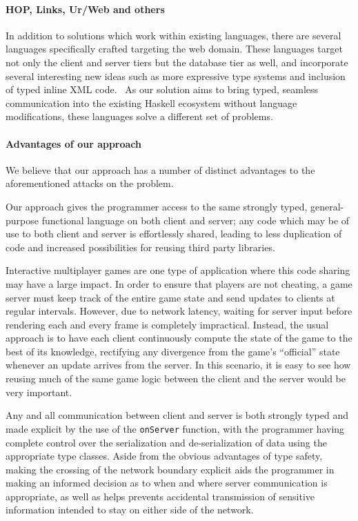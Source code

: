 \documentclass[preprint]{sigplanconf}
\begin{document}
\paragraph{HOP, Links, Ur/Web and others} In addition to solutions which work
within existing languages, there are several languages specifically crafted
targeting the web domain. These languages target not only the client and server
tiers but the database tier as well, and incorporate several interesting new
ideas such as more expressive type systems and inclusion of typed inline XML
code.\ \cite{hop}\cite{links}\cite{urweb} As our solution aims to bring typed,
seamless communication into the existing Haskell ecosystem without language
modifications, these languages solve a different set of problems.

\paragraph{Advantages of our approach} We believe that our approach has a
number of distinct advantages to the aforementioned attacks on the problem.

Our approach gives the programmer access to the same strongly typed,
general-purpose functional language on both client and server; any code which
may be of use to both client and server is effortlessly shared, leading to less
duplication of code and increased possibilities for reusing third party
libraries.

Interactive multiplayer games are one type of application where this code
sharing may have a large impact. In order to ensure that players are not
cheating, a game server must keep track of the entire game state and send
updates to clients at regular intervals. However, due to network latency,
waiting for server input before rendering each and every frame is completely
impractical. Instead, the usual approach is to have each client continuously
compute the state of the game to the best of its knowledge, rectifying any
divergence from the game's ``official'' state whenever an update arrives from
the server. In this scenario, it is easy to see how reusing much of the same
game logic between the client and the server would be very important.

Any and all communication between client and server is both strongly typed
and made explicit by the use of the \lstinline!onServer! function, with the
programmer having complete control over the serialization and de-serialization
of data using the appropriate type classes. Aside from the obvious advantages
of type safety, making the crossing of the network boundary explicit aids the
programmer in making an informed decision as to when and where server
communication is appropriate, as well as helps prevents accidental transmission
of sensitive information intended to stay on either side of the network.
\end{document}
